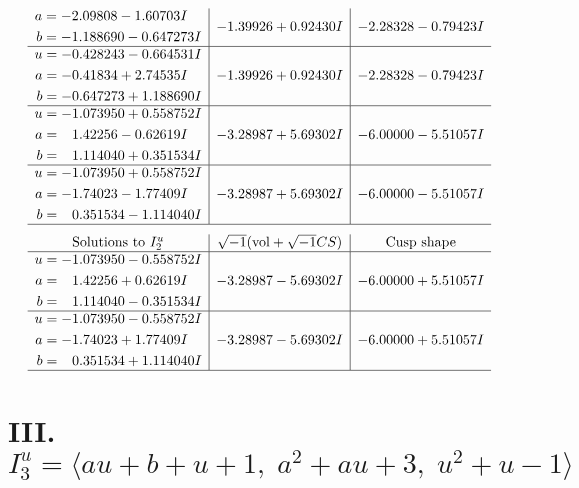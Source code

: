 \documentclass[1p]{elsarticle_modified}
\theoremstyle{definition}
\newcommand{\I}{\sqrt{-1}}
\begin{document}
$$\begin{array}{c|c|c}
\begin{aligned}
a &= -2.09808 - 1.60703 I \\
b &= -1.188690 - 0.647273 I\end{aligned}
 & -1.39926 + 0.92430 I & -2.28328 - 0.79423 I \\ \hline\begin{aligned}
u &= -0.428243 - 0.664531 I \\
a &= -0.41834 + 2.74535 I \\
b &= -0.647273 + 1.188690 I\end{aligned}
 & -1.39926 + 0.92430 I & -2.28328 - 0.79423 I \\ \hline\begin{aligned}
u &= -1.073950 + 0.558752 I \\
a &= \phantom{-}1.42256 - 0.62619 I \\
b &= \phantom{-}1.114040 + 0.351534 I\end{aligned}
 & -3.28987 + 5.69302 I & -6.00000 - 5.51057 I \\ \hline\begin{aligned}
u &= -1.073950 + 0.558752 I \\
a &= -1.74023 - 1.77409 I \\
b &= \phantom{-}0.351534 - 1.114040 I\end{aligned}
 & -3.28987 + 5.69302 I & -6.00000 - 5.51057 I\\
 \hline 
 \end{array}$$\newpage$$\begin{array}{c|c|c}  
\text{Solutions to }I^u_{2}& \I (\text{vol} + \sqrt{-1}CS) & \text{Cusp shape}\\
 \hline 
\begin{aligned}
u &= -1.073950 - 0.558752 I \\
a &= \phantom{-}1.42256 + 0.62619 I \\
b &= \phantom{-}1.114040 - 0.351534 I\end{aligned}
 & -3.28987 - 5.69302 I & -6.00000 + 5.51057 I \\ \hline\begin{aligned}
u &= -1.073950 - 0.558752 I \\
a &= -1.74023 + 1.77409 I \\
b &= \phantom{-}0.351534 + 1.114040 I\end{aligned}
 & -3.28987 - 5.69302 I & -6.00000 + 5.51057 I\\
 \hline 
 \end{array}$$\newpage\newpage\renewcommand{\arraystretch}{1}
\centering \section*{III. $I^u_{3}= \langle a u+b+u+1,\;a^2+a u+3,\;u^2+u-1 \rangle$}
\end{document}
